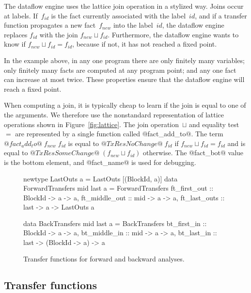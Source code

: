 \documentclass[blockstyle,preprint,natbib,nocopyrightspace]{sigplanconf}
\newcommand\join{\sqcup}
\newcommand\seclabel[1]{\label{sec:#1}}
\newcommand\figref[1]{Figure~\ref{fig:#1}}
\newcommand\figlabel[1]{\label{fig:#1}}
\begin{document}
The dataflow engine uses the lattice join operation in a stylized way.
Joins occur at labels.
If~$f_{\mathit{id}}$ is the fact currently associated with the
label~$\mathit{id}$, 
and if a transfer function propagates a new fact~$f_{\mathit{new}}$
into the label~$\mathit{id}$, 
the dataflow engine replaces $f_{\mathit{id}}$ with
the join  $f_{\mathit{new}} \join f_{\mathit{id}}$.
Furthermore, the dataflow engine wants to know if
  $f_{\mathit{new}} \join f_{\mathit{id}} = f_{\mathit{id}}$,
because if not, it has not reached a fixed point.

In the example above, in any one program there are only finitely many variables;
only finitely many facts are computed at any program point;
and any one fact can increase at most twice.
These properties
ensure that the dataflow engine will
reach a fixed point.



When computing a join, 
it is typically cheap to learn if the join
is equal to one of the arguments.
We therefore use the nonstandard representation of lattice operations
shown in \figref{lattice}.
The join operation~$\join$ and equality test~$=$ are represented by a
single function called @fact_add_to@.
The term $@fact_add_to@\;f_{\mathit{new}}\;f_{\mathit{id}}$ is equal to
$@TxRes NoChange@\; f_{\mathit{id}}$ if $f_{\mathit{new}} \join f_{\mathit{id}} = f_{\mathit{id}}$
and is equal to
$@TxRes SomeChange@\; (f_{\mathit{new}} \join f_{\mathit{id}})$ otherwise.
The @fact_bot@ value is the bottom element, 
and @fact_name@  is used for debugging.

\begin{figure}
\begin{code}
newtype LastOuts a = LastOuts [(BlockId, a)]
data ForwardTransfers mid last a = ForwardTransfers
 {ft_first_out  :: BlockId -> a -> a,
  ft_middle_out :: mid     -> a -> a,
  ft_last_outs  :: last    -> a -> LastOuts a} 

data BackTransfers mid last a = BackTransfers
 {bt_first_in  :: BlockId -> a              -> a,
  bt_middle_in :: mid     -> a              -> a,
  bt_last_in   :: last    -> (BlockId -> a) -> a} 
\end{code}
\caption{Transfer functions for forward and backward analyses.}
\figlabel{transfers}
%
%
\end{figure}



\subsection{Transfer functions} \seclabel{tffuns}
\end{document}
